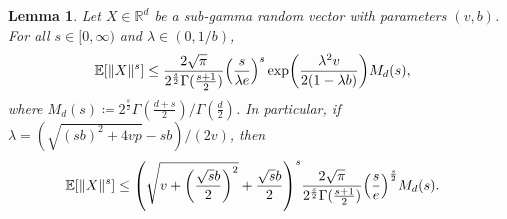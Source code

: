 \documentclass{article}
\newtheorem{lemma}[theorem]{Lemma}
\theoremstyle{definition}
\newcommand{\reals}{\mathbb{R}}
\newcommand{\ex}[1]{\ensuremath{\mathbb{E}\left[ #1\right]}}
\let\originalleft\left
\let\originalright\right
\renewcommand{\left}{\mathopen{}\mathclose\bgroup\originalleft}
\renewcommand{\right}{\aftergroup\egroup\originalright}
\begin{document}
\begin{lemma}\label{lem:subgamma_bnd}
Let $X \in \reals^d$ be a sub-gamma random vector with parameters $(v, b)$. For all $s \in [0, \infty)$ and $\lambda \in (0,1/b)$, 
\begin{align}
\ex{ \|X\|^s}  
& \le  \frac{2  \sqrt{ \pi} }{2^\frac{s}{2} \Gamma( \frac{s+1}{2} )  } \left(\frac{s}{\lambda  e} \right)^s \exp\left(  \frac{ \lambda^2 v}{ 2 (1 - \lambda b)}  \right)  M_d(s) ,  \label{eq:subgamma_UB1alt}
\end{align} 
where $M_d(s)  \coloneqq   2^\frac{s}{2}  \Gamma( \frac{d+ s}{ 2}) /  \Gamma( \frac{d}{2})$. In particular, if $\lambda =(\sqrt{ (sb)^2 + 4 vp}  -sb )/(2v) $, 
then
\begin{align}
\ex{ \|X\|^s} 
& \le  \left(  \sqrt{v +  \left(\frac{\sqrt{s} b}{2 } \right )^2  } + \frac{\sqrt{s} b}{2}  \right)^s  \frac{2  \sqrt{ \pi} }{2^\frac{s}{2} \Gamma( \frac{s+1}{2} ) } \left(\frac{s}{  e} \right)^\frac{s}{2} M_d(s)  .\label{eq:subgamma_UB2}
\end{align} 
\end{lemma}
\end{document}
